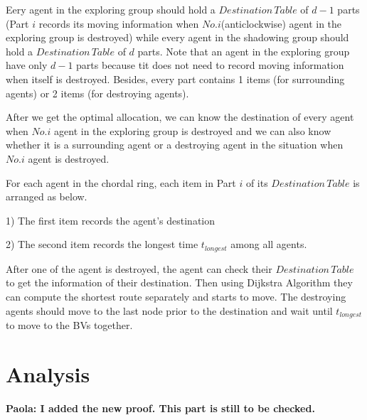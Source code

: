 Eery agent in the exploring group should hold a $Destination\,Table$ of $d-1$ parts (Part $i$ records its moving information when $No.i$(anticlockwise) agent in the exploring group is destroyed) while   every agent in the shadowing group should hold a $Destination\,Table$ of $d$ parts. Note that an agent in the exploring group have only $d-1$ parts because tit does not need to record moving information when itself is destroyed. Besides, every part contains 1 items (for surrounding agents) or 2 items (for destroying agents). 

After we get the optimal allocation, we can know the destination of every agent when $No.i$ agent in the exploring group is destroyed and we can also know whether it is a surrounding agent or a destroying agent in the situation when $No.i$ agent is destroyed.

For each agent in the chordal ring, each item in Part $i$ of its $Destination\,Table$ is arranged as below. 
\begin{description}
\item 1) The first item records the agent's destination
\item 2) The second item records the longest time $t_{longest}$ among all agents.
\end{description}


After one of the agent is destroyed, the agent can check their $Destination\,Table$ to get the information of their destination. Then using Dijkstra Algorithm they can compute the shortest route separately and starts to move. The destroying agents should move to the last node prior to the destination and wait until $t_{longest}$ to move to the BVs together. 


\section{Analysis}

{\bf Paola: I added the new proof. This part is still to be checked.}

